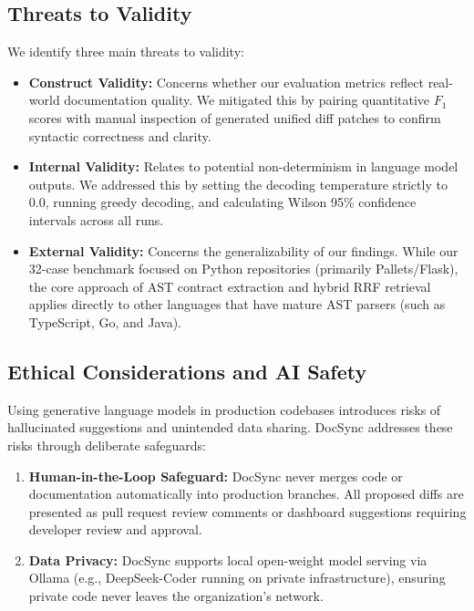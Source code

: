 \documentclass[12pt,onecolumn,draftclsnofoot]{IEEEtran}
\begin{document}
\subsection{Threats to Validity}
We identify three main threats to validity:
\begin{itemize}
    \item \textbf{Construct Validity:} Concerns whether our evaluation metrics reflect real-world documentation quality. We mitigated this by pairing quantitative $F_1$ scores with manual inspection of generated unified diff patches to confirm syntactic correctness and clarity.
    \item \textbf{Internal Validity:} Relates to potential non-determinism in language model outputs. We addressed this by setting the decoding temperature strictly to 0.0, running greedy decoding, and calculating Wilson 95\% confidence intervals across all runs.
    \item \textbf{External Validity:} Concerns the generalizability of our findings. While our 32-case benchmark focused on Python repositories (primarily Pallets/Flask), the core approach of AST contract extraction and hybrid RRF retrieval applies directly to other languages that have mature AST parsers (such as TypeScript, Go, and Java).
\end{itemize}

\subsection{Ethical Considerations and AI Safety}
Using generative language models in production codebases introduces risks of hallucinated suggestions and unintended data sharing. DocSync addresses these risks through deliberate safeguards:
\begin{enumerate}
    \item \textbf{Human-in-the-Loop Safeguard:} DocSync never merges code or documentation automatically into production branches. All proposed diffs are presented as pull request review comments or dashboard suggestions requiring developer review and approval.
    \item \textbf{Data Privacy:} DocSync supports local open-weight model serving via Ollama (e.g., DeepSeek-Coder running on private infrastructure), ensuring private code never leaves the organization's network.
\end{enumerate}
\end{document}
